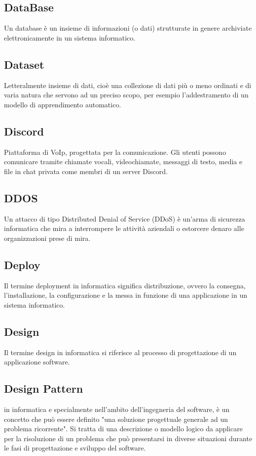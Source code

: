 \documentclass{classes/base}
\begin{document}
        \subsection*{DataBase}
        Un database è un insieme di informazioni (o dati) strutturate in genere archiviate elettronicamente in un sistema informatico.

        \subsection*{Dataset}
        Letteralmente insieme di dati, cioè una collezione di dati più o meno ordinati e di varia natura che servono ad un preciso scopo, per esempio l'addestramento di un modello di apprendimento automatico.
       
        \subsection*{Discord}
        Piattaforma di VoIp, progettata per la comunicazione. Gli utenti possono comunicare tramite chiamate vocali, videochiamate, messaggi di testo, media e file in chat privata come membri di un server Discord.

        \subsection*{DDOS}
        Un attacco di tipo Distributed Denial of Service (DDoS) è un'arma di sicurezza informatica che mira a interrompere le attività aziendali o estorcere denaro alle organizzazioni prese di mira.

        \subsection*{Deploy}
        Il termine deployment in informatica significa distribuzione, ovvero la consegna, l'installazione, la configurazione e la messa in funzione di una applicazione in un sistema informatico.

        \subsection*{Design}
        Il termine design in informatica si riferisce al processo di progettazione di un applicazione software.

        \subsection*{Design Pattern}
        in informatica e specialmente nell'ambito dell'ingegneria del software, è un concetto che può essere definito "una soluzione progettuale generale ad un problema ricorrente".
        Si tratta di una descrizione o modello logico da applicare per la risoluzione di un problema che può presentarsi in diverse situazioni durante le fasi di progettazione e sviluppo del software.
\end{document}

